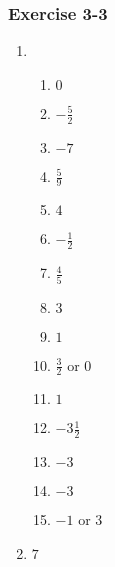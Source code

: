 {\begin{multicols}{3}
  \subsubsection*{Exercise 3-3} %
  \begin{enumerate}[label=\textbf{\arabic*}.,itemsep=1pt]
  \item %
    \begin{enumerate}[label=\textbf{(\alph*)}, itemsep=1pt]
    \item $0$%
    \item $-\frac{5}{2}$%
    \item $-7$%
    \item $\frac{5}{9}$%
    \item $4$%
    \item $-\frac{1}{2}$%
    \item $\frac{4}{5}$%
    \item $3$%
    \item $1$%
    \item $\frac{3}{2}$ or $0$%
    \item $1$%
\item $-3\frac{1}{2}$ %
\item $-3$ %
\item $-3$ %
\item $-1$ or $3$ %
    \end{enumerate}
  \item $7$%
  \end{enumerate}


\end{multicols}}
